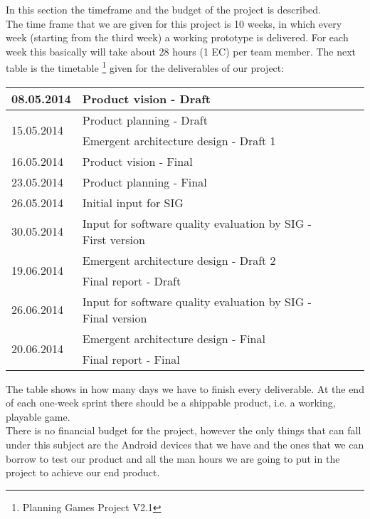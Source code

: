In this section the timeframe and the budget of the project is described. \\
The time frame that we are given for this project is 10 weeks, in which every week (starting from the third week) a working prototype is delivered. For each week this basically will take about 28 hours (1 EC) per team member. 
The next table is the timetable \footnote{Planning Games Project V2.1} given for the deliverables of our project:
\begin{center}
	\begin{tabular}{|  p{5cm}| l | p{10cm}  l }
		\hline
	 	08.05.2014 & Product vision - Draft \\ \hline
		\multirow{2}{*}{15.05.2014} & Product planning - Draft \\ \cline{2-2}
		& Emergent architecture design - Draft 1 \\ \hline
		16.05.2014 & Product vision - Final \\ \hline
		23.05.2014 & Product planning - Final \\ \hline
		26.05.2014 & Initial input for SIG \\ \hline
		30.05.2014 & Input for software quality evaluation by SIG - First version \\ \hline
		\multirow{2}{*}{19.06.2014} & Emergent architecture design - Draft 2 \\ \cline{2-2}
		& Final report - Draft \\ \hline
		26.06.2014 & Input for software quality evaluation by SIG - Final version \\ \hline
		\multirow{2}{*}{20.06.2014} & Emergent architecture design - Final \\ \cline{2-2}
		& Final report - Final \\ \hline
	\end{tabular}
\end{center}
The table shows in how many days we have to finish every deliverable. At the end of each one-week sprint there should be a shippable product, i.e. a working, playable game. \\
\newline
There is no financial budget for the project, however the only things that can fall under this subject are the Android devices that we have and the ones that we can borrow to test our product and all the man hours we are going to put in the project to achieve our end product.
